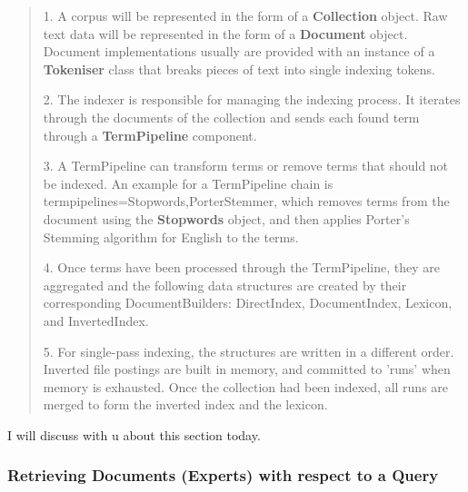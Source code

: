 \begin{quotation}
 \item 1. A corpus will be represented in the form of a \textbf{Collection} object. Raw text data will be represented in the form of a \textbf{Document} object. 
 Document implementations usually are provided with an instance of a \textbf{Tokeniser} class that breaks pieces of text into single indexing tokens.
 \item 2. The indexer is responsible for managing the indexing process. It iterates through the documents of the collection and sends each found 
 term through a \textbf{TermPipeline} component.
 \item 3. A TermPipeline can transform terms or remove terms that should not be indexed. An example for a TermPipeline chain is 
 termpipelines=Stopwords,PorterStemmer, which removes terms from the document using the \textbf{Stopwords} object, and then applies Porter's Stemming algorithm 
 for English to the terms.
 \item 4. Once terms have been processed through the TermPipeline, they are aggregated and the following data structures are created by their corresponding 
 DocumentBuilders: DirectIndex, DocumentIndex, Lexicon, and InvertedIndex.
 \item 5. For single-pass indexing, the structures are written in a different order. Inverted file postings are built in memory, and committed to 'runs' 
 when memory is exhausted. Once the collection had been indexed, all runs are merged to form the inverted index and the lexicon.
\end{quotation}

I will discuss with u about this section today.

\subsubsection{Retrieving Documents (Experts) with respect to a Query} \label{section:union}

